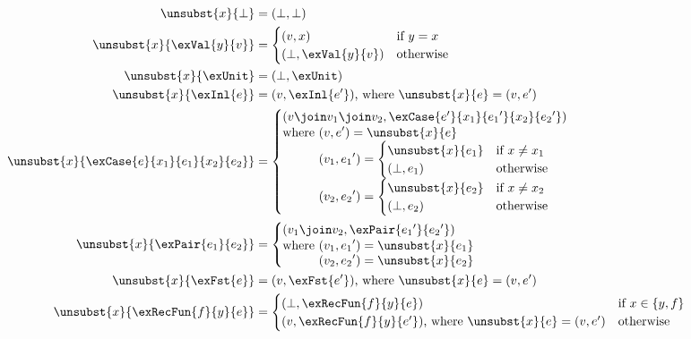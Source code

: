 \begin{figure*}
\begin{align*}
\unsubst{x}{\bot}
&=
(\bot,\bot)
\\
\unsubst{x}{\exVal{y}{v}}
&=
\begin{cases}
(v,x)
&
\text{if }y = x
\\
(\bot,\exVal{y}{v})
&
\text{otherwise}
\end{cases}
\\
\unsubst{x}{\exUnit}
&=
(\bot,\exUnit)
\\
\unsubst{x}{\exInl{e}}
&=
(v,\exInl{e'})\text{, where }\unsubst{x}{e} = (v,e')
\\
\unsubst{x}{\exCase{e}{x_1}{e_1}{x_2}{e_2}}
&=
\begin{cases}
(v \join v_1 \join v_2, \exCase{e'}{x_1}{{e_1}'}{x_2}{{e_2}'})
\\
\begin{aligned}
\text{where }
&
(v,e')
=
\unsubst{x}{e}
\\
&
(v_1,{e_1}')
=
\begin{cases}
\unsubst{x}{e_1}
&
\text{if }x \neq x_1
\\
(\bot,e_1)
&
\text{otherwise}
\end{cases}
\\
&
(v_2,{e_2}')
=
\begin{cases}
\unsubst{x}{e_2}
&
\text{if }x \neq x_2
\\
(\bot,e_2)
&
\text{otherwise}
\end{cases}
\end{aligned}
\end{cases}
\\
\unsubst{x}{\exPair{e_1}{e_2}}
&=
\begin{cases}
(v_1 \join v_2, \exPair{{e_1}'}{{e_2}'})
\\
\begin{aligned}
\text{where }
&
(v_1, {e_1}') = \unsubst{x}{e_1}
\\
&
(v_2, {e_2}') = \unsubst{x}{e_2}
\end{aligned}
\end{cases}
\\
\unsubst{x}{\exFst{e}}
&=
(v, \exFst{e'})\text{, where }\unsubst{x}{e} = (v,e')
\\
\unsubst{x}{\exRecFun{f}{y}{e}}
&=
\begin{cases}
(\bot,\exRecFun{f}{y}{e})
&
\text{if }x \in \{y, f\}
\\
(v,\exRecFun{f}{y}{e'})\text{, where }\unsubst{x}{e} = (v,e')
&
\text{otherwise}

\end{cases}
\end{align*}
\end{figure*}
